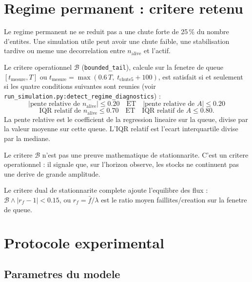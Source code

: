 \documentclass[11pt,a4paper]{article}
\begin{document}
\section{Regime permanent : critere retenu}
\label{sec:critere-regime}

Le regime permanent ne se reduit pas a une chute forte de 25\,\% du nombre
d'entites. Une simulation utile peut avoir une chute faible, une stabilisation
tardive ou meme une decorrelation entre \(n_{\mathrm{alive}}\) et l'actif.

Le critere operationnel \(\mathcal{B}\) (\texttt{bounded\_tail}), calcule sur
la fenetre de queue $[t_{\mathrm{mesure}}, T]$ ou
$t_{\mathrm{mesure}} = \max(0.6\,T,\;t_{\mathrm{chute5}} + 100)$, est satisfait
si et seulement si les quatre conditions suivantes sont reunies
(voir \texttt{run\_simulation.py:detect\_regime\_diagnostics}) :
\[
  |\text{pente relative de }n_{\mathrm{alive}}| \le 0.20
  \quad\text{ET}\quad
  |\text{pente relative de }A| \le 0.20
\]
\[
  \text{IQR relatif de }n_{\mathrm{alive}} \le 0.70
  \quad\text{ET}\quad
  \text{IQR relatif de }A \le 0.80.
\]
La pente relative est le coefficient de la regression lineaire sur la queue,
divise par la valeur moyenne sur cette queue.
L'IQR relatif est l'ecart interquartile divise par la mediane.

Le critere \(\mathcal{B}\) n'est pas une preuve mathematique de stationnarite.
C'est un critere operationnel : il signale que, sur l'horizon observe, les
stocks ne continuent pas une derive de grande amplitude.

Le critere dual de stationnarite complete ajoute l'equilibre des flux :
$\mathcal{B} \wedge |r_f - 1| < 0.15$, ou $r_f = \bar{f}/\lambda$ est le
ratio moyen faillites/creation sur la fenetre de queue.

\section{Protocole experimental}
\label{sec:protocole}

\subsection*{Parametres du modele}
\end{document}
